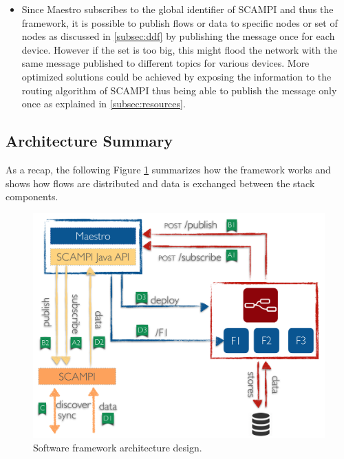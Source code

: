 \begin{itemize}
\item Since Maestro subscribes to the global identifier of SCAMPI and thus the framework, it is possible to publish flows or data to specific nodes or set of nodes as discussed in \ref{subsec:ddf} by  publishing the message once for each device. However if the set is too big, this might flood the network with the same message published to different topics for various devices. More optimized solutions could be achieved by exposing the information to the routing algorithm of SCAMPI thus being able to publish the message only once as explained in \ref{subsec:resources}. \\



\end{itemize}
\subsection{Architecture Summary}

As a recap, the following Figure \ref{fig:design} summarizes how the framework works and shows how flows are distributed and data is exchanged between the stack components. 
\begin{figure}[H]
	\centering
	\includegraphics[scale=0.5]{images/design.png}
	\caption{Software framework architecture design. }
	\label{fig:design}
\end{figure}

